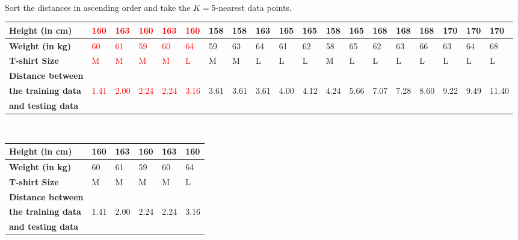 \documentclass{book}
\begin{document}
\\
Sort the distances in ascending order and take the \(K = 5\)-nearest data points.\\
\begin{center}
    \begin{tabular}{|m{3cm}|m{0.5cm}|m{0.5cm}|m{0.5cm}|m{0.5cm}|m{0.5cm}|m{0.5cm}|m{0.5cm}|m{0.5cm}|m{0.5cm}|m{0.5cm}|m{0.5cm}|m{0.5cm}|m{0.5cm}|m{0.5cm}|m{0.5cm}|m{0.5cm}|m{0.5cm}|m{0.7cm}|}
        \hline
        \textbf{Height (in cm)} & \textcolor{red}{160} & \textcolor{red}{163} & \textcolor{red}{160} & \textcolor{red}{163} & \textcolor{red}{160} & 158 & 158 & 163 & 165 & 165 & 158 & 165 & 168 & 168 & 168 & 170 & 170 & 170 \\
        \hline
        \textbf{Weight (in kg)} & \textcolor{red}{60} & \textcolor{red}{61} & \textcolor{red}{59} & \textcolor{red}{60} & \textcolor{red}{64} & 59 & 63 & 64 & 61 & 62 & 58 & 65 & 62 & 63 & 66 & 63 & 64 & 68 \\
        \hline
        \textbf{T-shirt Size} & \textcolor{red}{M} & \textcolor{red}{M} & \textcolor{red}{M} & \textcolor{red}{M} & \textcolor{red}{L} & M & M & L & L & L & M & L & L & L & L & L & L & L \\
        \hline
        \textbf{Distance between} & & & & & & & & & & & & & & & & & & \\
        \textbf{the training data} & \textcolor{red}{\scriptsize{1.41}} & \textcolor{red}{\scriptsize{2.00}} & \textcolor{red}{\scriptsize{2.24}} & \textcolor{red}{\scriptsize{2.24}} & \textcolor{red}{\scriptsize{3.16}} & \scriptsize{3.61} & \scriptsize{3.61} & \scriptsize{3.61} & \scriptsize{4.00} & \scriptsize{4.12} & \scriptsize{4.24} & \scriptsize{5.66} & \scriptsize{7.07} & \scriptsize{7.28} & \scriptsize{8.60} & \scriptsize{9.22} & \scriptsize{9.49} & \scriptsize{11.40} \\
        \textbf{and testing data} & & & & & & & & & & & & & & & & & & \\
        \hline
        \end{tabular}
\end{center}
\\
\begin{center}
    \begin{tabular}{|m{3cm}|m{0.6cm}|m{0.6cm}|m{0.6cm}|m{0.6cm}|m{0.6cm}|}
        \hline
        \textbf{Height (in cm)} & 160 & 163 & 160 & 163 & 160 \\
        \hline
        \textbf{Weight (in kg)} & 60 & 61 & 59 & 60 & 64 \\
        \hline
        \textbf{T-shirt Size} & M & M & M & M & L \\
        \hline
        \textbf{Distance between} & & & & & \\
        \textbf{the training data} & 1.41 & 2.00 & 2.24 & 2.24 & 3.16 \\
        \textbf{and testing data} & & & & & \\
        \hline
        \end{tabular}
\end{center}
\end{document}
